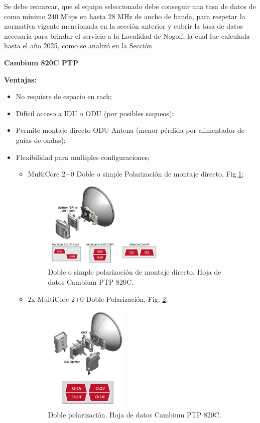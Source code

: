 \documentclass[12pt,a4paper]{book}
\begin{document}
Se debe remarcar, que el equipo seleccionado debe conseguir una tasa de datos de como mínimo 240 Mbps en hasta 28 MHz de ancho de banda, para respetar la normativa vigente mencionada en la sección anterior y cubrir la tasa de datos necesaria para brindar el servicio a la Localidad de Nogolí, la cual fue calculada hasta el año 2025, como se analizó en la Sección %

\textbf{Cambium 820C PTP}


\textbf{Ventajas:}

\begin{itemize}
\item No requiere de espacio en rack;
\item Difícil acceso a IDU o ODU (por posibles saqueos);
\item Permite montaje directo ODU-Antena (menor pérdida por alimentador de guías de ondas);
\item Flexibilidad para multiples configuraciones;
	\begin{itemize}
	\item MultiCore 2+0 Doble o simple Polarización de montaje directo, Fig.\ref{fig_cambium_1};
	
\begin{figure} [H]
\centering
\includegraphics[width= 6cm]{../figuras/cambium_1.jpg}
\caption{Doble o simple polarización de montaje directo. Hoja de datos Cambium PTP 820C.}
\label{fig_cambium_1}
\end{figure}
	
	\item 2x MultiCore 2+0 Doble Polarización, Fig. \ref{fig_cambium_2};
\begin{figure} [H]
\centering
\includegraphics[width= 4cm]{../figuras/cambium_2.jpg}
\caption{Doble polarización. Hoja de datos Cambium PTP 820C.}
\label{fig_cambium_2}
\end{figure}	


\end{itemize}
\end{itemize}
\end{document}
